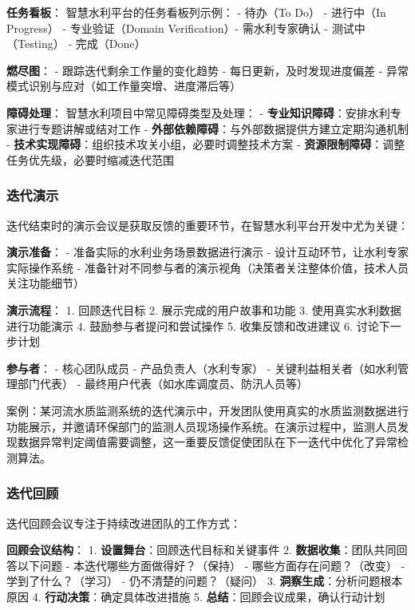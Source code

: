 \textbf{任务看板}： 智慧水利平台的任务看板列示例： - 待办（To Do） -
进行中（In Progress） - 专业验证（Domain Verification）- 需水利专家确认
- 测试中（Testing） - 完成（Done）

\textbf{燃尽图}： - 跟踪迭代剩余工作量的变化趋势 -
每日更新，及时发现进度偏差 -
异常模式识别与应对（如工作量突增、进度滞后等）

\textbf{障碍处理}： 智慧水利项目中常见障碍类型及处理： -
\textbf{专业知识障碍}：安排水利专家进行专题讲解或结对工作 -
\textbf{外部依赖障碍}：与外部数据提供方建立定期沟通机制 -
\textbf{技术实现障碍}：组织技术攻关小组，必要时调整技术方案 -
\textbf{资源限制障碍}：调整任务优先级，必要时缩减迭代范围

\subsubsection{迭代演示}\label{ux8fedux4ee3ux6f14ux793a}

迭代结束时的演示会议是获取反馈的重要环节，在智慧水利平台开发中尤为关键：

\textbf{演示准备}： - 准备实际的水利业务场景数据进行演示 -
设计互动环节，让水利专家实际操作系统 -
准备针对不同参与者的演示视角（决策者关注整体价值，技术人员关注功能细节）

\textbf{演示流程}： 1. 回顾迭代目标 2. 展示完成的用户故事和功能 3.
使用真实水利数据进行功能演示 4. 鼓励参与者提问和尝试操作 5.
收集反馈和改进建议 6. 讨论下一步计划

\textbf{参与者}： - 核心团队成员 - 产品负责人（水利专家） -
关键利益相关者（如水利管理部门代表） -
最终用户代表（如水库调度员、防汛人员等）

案例：某河流水质监测系统的迭代演示中，开发团队使用真实的水质监测数据进行功能展示，并邀请环保部门的监测人员现场操作系统。在演示过程中，监测人员发现数据异常判定阈值需要调整，这一重要反馈促使团队在下一迭代中优化了异常检测算法。

\subsubsection{迭代回顾}\label{ux8fedux4ee3ux56deux987e}

迭代回顾会议专注于持续改进团队的工作方式：

\textbf{回顾会议结构}： 1. \textbf{设置舞台}：回顾迭代目标和关键事件 2.
\textbf{数据收集}：团队共同回答以下问题 - 本迭代哪些方面做得好？（保持）
- 哪些方面存在问题？（改变） - 学到了什么？（学习） -
仍不清楚的问题？（疑问） 3. \textbf{洞察生成}：分析问题根本原因 4.
\textbf{行动决策}：确定具体改进措施 5.
\textbf{总结}：回顾会议成果，确认行动计划

